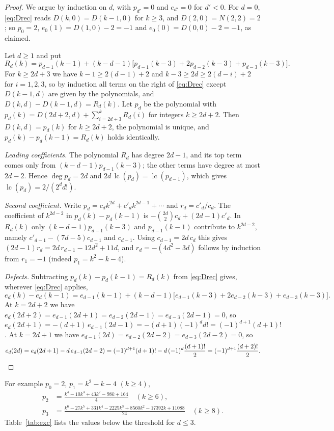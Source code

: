 \documentclass[11pt]{amsart}
\theoremstyle{definition}
\DeclareMathOperator{\lc}{lc}
\begin{document}
\begin{proof}
We argue by induction on $d$, with $p_{d'}=0$ and $e_{d'}=0$ for $d'<0$. For $d=0$, \eqref{eq:Drec} reads $D(k,0)=D(k-1,0)$ for $k\ge3$, and $D(2,0)=N(2,2)=2$; so $p_0=2$, $e_0(1)=D(1,0)-2=-1$ and $e_0(0)=D(0,0)-2=-1$, as claimed.

Let $d\ge1$ and put
\[
  R_d(k)=p_{d-1}(k-1)+(k-d-1)\bigl[p_{d-1}(k-3)+2p_{d-2}(k-3)+p_{d-3}(k-3)\bigr].
\]
For $k\ge2d+3$ we have $k-1\ge2(d-1)+2$ and $k-3\ge2d\ge2(d-i)+2$ for $i=1,2,3$, so by induction all terms on the right of \eqref{eq:Drec} except $D(k-1,d)$ are given by the polynomials, and $D(k,d)-D(k-1,d)=R_d(k)$. Let $p_d$ be the polynomial with $p_d(k)=D(2d+2,d)+\sum_{i=2d+3}^{k}R_d(i)$ for integers $k\ge2d+2$. Then $D(k,d)=p_d(k)$ for $k\ge2d+2$, the polynomial is unique, and $p_d(k)-p_d(k-1)=R_d(k)$ holds identically.

\emph{Leading coefficients.} The polynomial $R_d$ has degree $2d-1$, and its top term comes only from $(k-d-1)p_{d-1}(k-3)$; the other terms have degree at most $2d-2$. Hence $\deg p_d=2d$ and $2d\,\lc(p_d)=\lc(p_{d-1})$, which gives $\lc(p_d)=2/(2^dd!)$.

\emph{Second coefficient.} Write $p_d=c_dk^{2d}+c'_dk^{2d-1}+\cdots$ and $r_d=c'_d/c_d$. The coefficient of $k^{2d-2}$ in $p_d(k)-p_d(k-1)$ is $-\binom{2d}{2}c_d+(2d-1)c'_d$. In $R_d(k)$ only $(k-d-1)p_{d-1}(k-3)$ and $p_{d-1}(k-1)$ contribute to $k^{2d-2}$, namely $c'_{d-1}-(7d-5)c_{d-1}$ and $c_{d-1}$. Using $c_{d-1}=2d\,c_d$ this gives $(2d-1)r_d=2d\,r_{d-1}-12d^2+11d$, and $r_d=-(4d^2-3d)$ follows by induction from $r_1=-1$ (indeed $p_1=k^2-k-4$).

\emph{Defects.} Subtracting $p_d(k)-p_d(k-1)=R_d(k)$ from \eqref{eq:Drec} gives, wherever \eqref{eq:Drec} applies,
\[
  e_d(k)-e_d(k-1)=e_{d-1}(k-1)+(k-d-1)\bigl[e_{d-1}(k-3)+2e_{d-2}(k-3)+e_{d-3}(k-3)\bigr].
\]
At $k=2d+2$ we have $e_d(2d+2)=e_{d-1}(2d+1)=e_{d-2}(2d-1)=e_{d-3}(2d-1)=0$, so $e_d(2d+1)=-(d+1)\,e_{d-1}(2d-1)=-(d+1)(-1)^dd!=(-1)^{d+1}(d+1)!$. At $k=2d+1$ we have $e_{d-1}(2d)=e_{d-2}(2d-2)=e_{d-3}(2d-2)=0$, so
\[
  e_d(2d)=e_d(2d+1)-d\,e_{d-1}(2d-2)=(-1)^{d+1}(d+1)!-d\,(-1)^d\frac{(d+1)!}{2}=(-1)^{d+1}\frac{(d+2)!}{2}.\qedhere
\]
\end{proof}

For example $p_0=2$, $p_1=k^2-k-4$ $(k\ge4)$,
\begin{align*}
  p_2&=\frac{k^4-10k^3+43k^2-98k+164}{4}\quad(k\ge6),\\
  p_3&=\frac{k^6-27k^5+331k^4-2225k^3+8560k^2-17392k+11088}{24}\quad(k\ge8).
\end{align*}
Table~\ref{tab:exc} lists the values below the threshold for $d\le3$.
\end{document}
